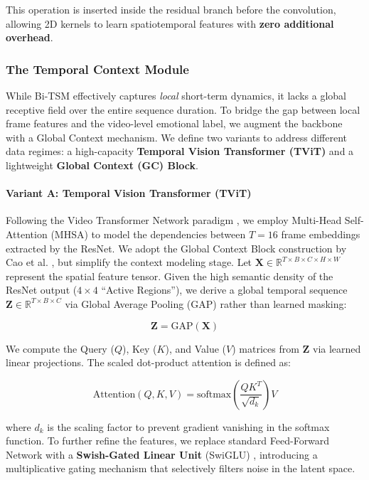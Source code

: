 \documentclass[conference]{IEEEtran}
\begin{document}
This operation is inserted inside the residual branch before the convolution, allowing 2D kernels to learn spatiotemporal features with \textbf{zero additional overhead}.


\subsubsection{The Temporal Context Module}
While Bi-TSM effectively captures \textit{local} short-term dynamics, it lacks a global receptive field over the entire sequence duration. To bridge the gap between local frame features and the video-level emotional label, we augment the backbone with a Global Context mechanism. We define two variants to address different data regimes: a high-capacity \textbf{Temporal Vision Transformer (TViT)} and a lightweight \textbf{Global Context (GC) Block}.

\paragraph{Variant A: Temporal Vision Transformer (TViT)}
Following the Video Transformer Network paradigm \cite{Neimark2021}, we employ Multi-Head Self-Attention (MHSA) \cite{Vaswani2017} to model the dependencies between $T = 16$ frame embeddings extracted by the ResNet. We adopt the Global Context Block construction by Cao et al. \cite{Cao2019}, but simplify the context modeling stage. Let $\mathbf{X} \in \mathbb{R}^{T \times B \times C \times H \times W}$ represent the spatial feature tensor. Given the high semantic density of the ResNet output ($4 \times 4$ ``Active Regions''), we derive a global temporal sequence $\mathbf{Z} \in \mathbb{R}^{T \times B \times C}$ via Global Average Pooling (GAP) rather than learned masking:

\begin{equation}
    \mathbf{Z} = \text{GAP}(\mathbf{X})
\end{equation}

We compute the Query ($Q$), Key ($K$), and Value ($V$) matrices from $\mathbf{Z}$ via learned linear projections. The scaled dot-product attention is defined as:

\begin{equation}
    \text{Attention}(Q,K,V) = \text{softmax}\left(\frac{QK^T}{\sqrt{d_k}}\right)V
\end{equation}

where $d_k$ is the scaling factor to prevent gradient vanishing in the softmax function. To further refine the features, we replace standard Feed-Forward Network with a \textbf{Swish-Gated Linear Unit} (SwiGLU) \cite{Shazeer2020}, introducing a multiplicative gating mechanism that selectively filters noise in the latent space.
\end{document}
